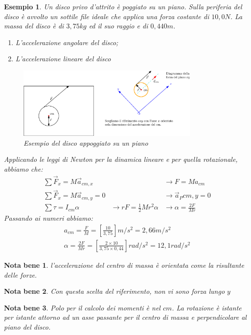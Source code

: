 \documentclass{book}
\newtheorem{notab}{Nota bene}
\newtheorem{esempio}{Esempio}
\begin{document}
\begin{esempio}
  Un disco privo d'attrito è poggiato su un piano. Sulla periferia del disco è avvolto un
  sottile file ideale che applica una forza costante di $10,0N$. La massa del disco è di
  $3,75kg$ ed il suo raggio e di $0,440m$.
  \begin{enumerate}
  \item L'accelerazione angolare del disco;
  \item L'accelerazione lineare del disco
  \end{enumerate}
  \begin{figure}[ht]
    \centering
    \includegraphics[width=9cm]{img/finiti/roto-trasl-es.eps}
    \caption{Esempio del disco appoggiato su un piano}
    \label{fig:roto-traslario-es}
  \end{figure}
  Applicando le leggi di Newton per la dinamica lineare e per quella rotazionale, abbiamo
  che:
  \begin{eqnarray}
    \displaystyle\sum \vec{F}_x=M\vec{a}_{cm,x} &&\to \boxed{F=Ma_{cm}}\\
    \displaystyle\sum\vec{F}_x=M\vec{a}_{cm,y}=0 && \to \boxed{\vec{a}_P{cm,y}=0}\\
    \displaystyle\sum \tau=I_{cm}\alpha &\to rF=\frac{1}{2}Mr^2\alpha
                                                 & \to\boxed{\alpha = \frac{2F}{Mr}}
  \end{eqnarray}
  Passando ai numeri abbiamo:
  \begin{equation*}
    \boxed{\begin{matrix}
             a_{cm}=\frac{F}{M}=\left[\frac{10}{3,75}\right]m/s^2=2,66m/s^2\\
             \alpha=\frac{2F}{Mr}=\left[\frac{2\times 10}{3,75\times 0,44}\right]rad/s^2
             =12,1rad/s^2
           \end{matrix}}
  \end{equation*} 
\end{esempio}
\begin{notab}
  l'accelerazione del centro di massa è orientata come la risultante delle forze.
\end{notab}
\begin{notab}
  Con questa scelta del riferimento, non vi sono forza lungo $y$
\end{notab}
\begin{notab}
  Polo per il calcolo dei momenti è nel $cm$. La rotazione è istante per istante attorno
  ad un asse passante per il centro di massa e perpendicolare al piano del disco.
\end{notab}
\end{document}
